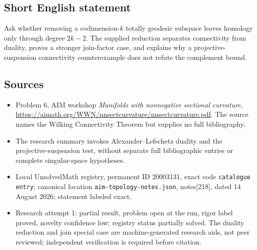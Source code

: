 \documentclass[11pt]{article}
\begin{document}
\subsection{Short English statement}
Ask whether removing a codimension-\(k\) totally geodesic subspace leaves homology only through degree \(2k-2\). The supplied reduction separates connectivity from duality, proves a stronger join-factor case, and explains why a projective-suspension connectivity counterexample does not refute the complement bound.
\subsection{Sources}
\begin{itemize}
\item Problem 6, AIM workshop \emph{Manifolds with nonnegative sectional curvature}, \url{https://aimath.org/WWN/nnsectcurvature/nnsectcurvature.pdf}. The source names the Wilking Connectivity Theorem but supplies no full bibliography.
\item The research summary invokes Alexander--Lefschetz duality and the projective-suspension test, without separate full bibliographic entries or complete singular-space hypotheses.
\item Local UnsolvedMath registry, permanent ID 20003131, exact code \texttt{catalogue entry}; canonical location \texttt{aim-topology-notes.json}, notes[218], dated 14 August 2026; statement labeled exact.
\item Research attempt 1: partial result, problem open at the run, rigor label proved, novelty confidence low; registry status partially solved. The duality reduction and join special case are machine-generated research aids, not peer reviewed; independent verification is required before citation.
\end{itemize}
\end{document}
